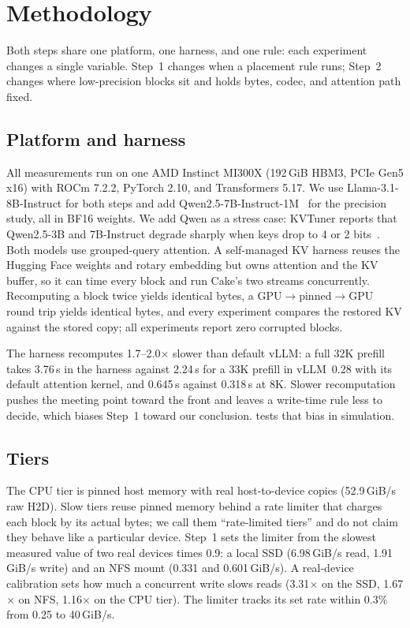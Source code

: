 \documentclass[conference]{IEEEtran}
\begin{document}
\section{Methodology}\label{sec:method}
Both steps share one platform, one harness, and one rule: each experiment changes a single variable.
Step~1 changes when a placement rule runs; Step~2 changes where low-precision blocks sit and holds bytes, codec, and attention path fixed.

\subsection{Platform and harness}\label{sec:method-platform}
All measurements run on one AMD Instinct MI300X (192\,GiB HBM3, PCIe Gen5 x16) with ROCm 7.2.2, PyTorch 2.10, and Transformers 5.17.
We use Llama-3.1-8B-Instruct for both steps and add Qwen2.5-7B-Instruct-1M~\cite{qwen25_1m_2025} for the precision study, all in BF16 weights.
We add Qwen as a stress case: KVTuner reports that Qwen2.5-3B and 7B-Instruct degrade sharply when keys drop to 4 or 2 bits~\cite{kvtuner2025}.
Both models use grouped-query attention.
A self-managed KV harness reuses the Hugging Face weights and rotary embedding but owns attention and the KV buffer, so it can time every block and run Cake's two streams concurrently.
Recomputing a block twice yields identical bytes, a GPU$\to$pinned$\to$GPU round trip yields identical bytes, and every experiment compares the restored KV against the stored copy; all experiments report zero corrupted blocks.

The harness recomputes 1.7--2.0$\times$ slower than default vLLM: a full 32K prefill takes 3.76\,s in the harness against 2.24\,s for a 33K prefill in vLLM~0.28 with its default attention kernel, and 0.645\,s against 0.318\,s at 8K.
Slower recomputation pushes the meeting point toward the front and leaves a write-time rule less to decide, which biases Step~1 toward our conclusion.
 tests that bias in simulation.

\subsection{Tiers}
The CPU tier is pinned host memory with real host-to-device copies (52.9\,GiB/s raw H2D).
Slow tiers reuse pinned memory behind a rate limiter that charges each block by its actual bytes; we call them ``rate-limited tiers'' and do not claim they behave like a particular device.
Step~1 sets the limiter from the slowest measured value of two real devices times 0.9: a local SSD (6.98\,GiB/s read, 1.91\,GiB/s write) and an NFS mount (0.331 and 0.601\,GiB/s).
A real-device calibration sets how much a concurrent write slows reads (3.31$\times$ on the SSD, 1.67$\times$ on NFS, 1.16$\times$ on the CPU tier).
The limiter tracks its set rate within 0.3\% from 0.25 to 40\,GiB/s.
\end{document}
